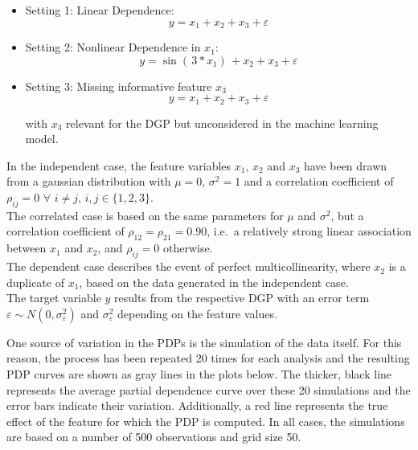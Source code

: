 \documentclass[]{krantz}
\providecommand{\tightlist}{%
  \setlength{\itemsep}{0pt}\setlength{\parskip}{0pt}}
\begin{document}
\begin{itemize}
\tightlist
\item
  Setting 1: Linear Dependence:\\

  \begin{equation}
  y = x_1 + x_2 + x_3 + \varepsilon \label{eq:10}
  \end{equation}
\item
  Setting 2: Nonlinear Dependence in \(x_1\):\\

  \begin{equation}
  y = \sin{( \, 3*x_1 ) \,} + x_2 + x_3 + \varepsilon \label{eq:11}
  \end{equation}
\item
  Setting 3: Missing informative feature \(x_3\)\\

  \begin{equation}
  y = x_1 + x_2 + x_3 + \varepsilon \label{eq:12}
  \end{equation}

  with \(x_3\) relevant for the DGP but unconsidered in the machine
  learning model.
\end{itemize}

In the independent case, the feature variables \(x_1\), \(x_2\) and
\(x_3\) have been drawn from a gaussian distribution with \(\mu = 0\),
\(\sigma^2 = 1\) and a correlation coefficient of \(\rho_{ij} = 0\)
\(\forall\) \(i \ne j\), \(i,j \in \{1,2,3\}\).\\
The correlated case is based on the same parameters for \(\mu\) and
\(\sigma^2\), but a correlation coefficient of
\(\rho_{12} = \rho_{21} = 0.90\), i.e.~a relatively strong linear
association between \(x_1\) and \(x_2\), and \(\rho_{ij} = 0\)
otherwise.\\
The dependent case describes the event of perfect multicollinearity,
where \(x_2\) is a duplicate of \(x_1\), based on the data generated in
the independent case.\\
The target variable \(y\) results from the respective DGP with an error
term \(\varepsilon \sim N(0, \sigma^2_\varepsilon)\) and
\(\sigma^2_\varepsilon\) depending on the feature values.

One source of variation in the PDPs is the simulation of the data
itself. For this reason, the process has been repeated 20 times for each
analysis and the resulting PDP curves are shown as gray lines in the
plots below. The thicker, black line represents the average partial
dependence curve over these 20 simulations and the error bars indicate
their variation. Additionally, a red line represents the true effect of
the feature for which the PDP is computed. In all cases, the simulations
are based on a number of 500 observations and grid size 50.
\end{document}
